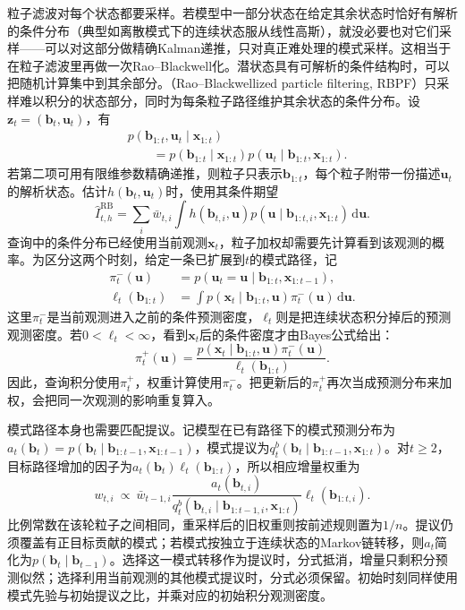 粒子滤波对每个状态都要采样。若模型中一部分状态在给定其余状态时恰好有解析的条件分布（典型如离散模式下的连续状态服从线性高斯），就没必要也对它们采样——可以对这部分做精确Kalman递推，只对真正难处理的模式采样。这相当于在粒子滤波里再做一次Rao–Blackwell化。潜状态具有可解析的条件结构时，可以把随机计算集中到其余部分。（Rao--Blackwellized particle filtering, RBPF）只采样难以积分的状态部分，同时为每条粒子路径维护其余状态的条件分布。设$\bm{z}_t=(\bm{b}_t,\bm{u}_t)$，有
\begin{equation}
  \begin{aligned}
    &p(\bm{b}_{1:t},\bm{u}_t\mid\bm{x}_{1:t})\\
    &\qquad=p(\bm{b}_{1:t}\mid\bm{x}_{1:t})
        p(\bm{u}_t\mid\bm{b}_{1:t},\bm{x}_{1:t}).
  \end{aligned}
  \label{eq:pgm-sampling-rbpf-factor}
\end{equation}
若第二项可用有限维参数精确递推，则粒子只表示$\bm{b}_{1:t}$，每个粒子附带一份描述$\bm{u}_t$的解析状态。估计$h(\bm{b}_t,\bm{u}_t)$时，使用其条件期望
\[
  \widehat I_{t,h}^{\mathrm{RB}}
    =\sum_i\bar w_{t,i}
      \int h(\bm{b}_{t,i},\bm{u})
       p(\bm{u}\mid\bm{b}_{1:t,i},\bm{x}_{1:t})\,\mathrm{d}\bm{u}.
\]
查询中的条件分布已经使用当前观测$\bm x_t$，粒子加权却需要先计算看到该观测的概率。为区分这两个时刻，给定一条已扩展到$t$的模式路径，记
\[
  \begin{aligned}
    \pi_t^-(\bm u)
      &=p(\bm u_t=\bm u\mid\bm b_{1:t},\bm x_{1:t-1}),\\
    \ell_t(\bm b_{1:t})
      &=\int p(\bm x_t\mid\bm b_{1:t},\bm u)
                \pi_t^-(\bm u)\,\mathrm d\bm u.
  \end{aligned}
\]
这里$\pi_t^-$是当前观测进入之前的条件预测密度，$\ell_t$则是把连续状态积分掉后的预测观测密度。若$0<\ell_t<\infty$，看到$\bm x_t$后的条件密度才由Bayes公式给出：
\[
  \pi_t^+(\bm u)
    =\frac{p(\bm x_t\mid\bm b_{1:t},\bm u)\pi_t^-(\bm u)}
           {\ell_t(\bm b_{1:t})}.
\]
因此，查询积分使用$\pi_t^+$，权重计算使用$\pi_t^-$。把更新后的$\pi_t^+$再次当成预测分布来加权，会把同一次观测的影响重复算入。

模式路径本身也需要匹配提议。记模型在已有路径下的模式预测分布为
$a_t(\bm b_t)=p(\bm b_t\mid\bm b_{1:t-1},\bm x_{1:t-1})$，模式提议为$q_t^b(\bm b_t\mid\bm b_{1:t-1},\bm x_{1:t})$。对$t\geq2$，目标路径增加的因子为$a_t(\bm b_t)\ell_t(\bm b_{1:t})$，所以相应增量权重为
\[
  w_{t,i}\ \propto\ \bar w_{t-1,i}
    \frac{a_t(\bm b_{t,i})}
         {q_t^b(\bm b_{t,i}\mid\bm b_{1:t-1,i},\bm x_{1:t})}
    \ell_t(\bm b_{1:t,i}).
\]
比例常数在该轮粒子之间相同，重采样后的旧权重则按前述规则置为$1/n$。提议仍须覆盖有正目标贡献的模式；若模式按独立于连续状态的Markov链转移，则$a_t$简化为$p(\bm b_t\mid\bm b_{t-1})$。选择这一模式转移作为提议时，分式抵消，增量只剩积分预测似然；选择利用当前观测的其他模式提议时，分式必须保留。初始时刻同样使用模式先验与初始提议之比，并乘对应的初始积分观测密度。

